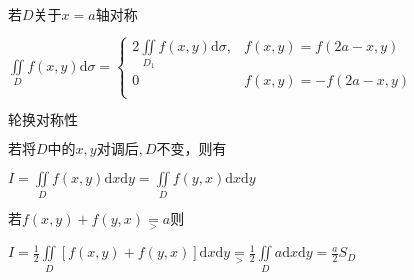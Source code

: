\begin{spacing}{\hangju}
\noindent $\mbox{若}D\mbox{关于}x=a\mbox{轴对称}$

$\iint\limits_{D}{f(x, y)\mathrm{d}\sigma} = \left\{ \begin{array}{ll}
    2\iint\limits_{D_{1}}{f(x, y)\mathrm{d}\sigma}, & f(x, y) = f(2a-x,y)\\
    0 & f(x, y) = -f(2a-x,y)\\
\end{array} \right.$

\noindent$\mbox{轮换对称性}$

\noindent$\mbox{若将}D\mbox{中的}x, y\mbox{对调后},D\mbox{不变，则有}$

$I = \iint\limits_{D}{f(x,y)\mathrm{d}x\mathrm{d}y} = \iint\limits_{D}{f(y,x)\mathrm{d}x\mathrm{d}y}$

\noindent $\mbox{若}f(x, y)+f(y,x) \underset{>}{=} a\mbox{则}$

$I = \frac{1}{2}\iint\limits_{D}{[f(x,y)+f(y,x)]\mathrm{d}x\mathrm{d}y}\underset{>}{=}\frac{1}{2}\iint\limits_D{a\mathrm{d}x\mathrm{d}y} = \frac{a}{2}S_D$
\end{spacing}
